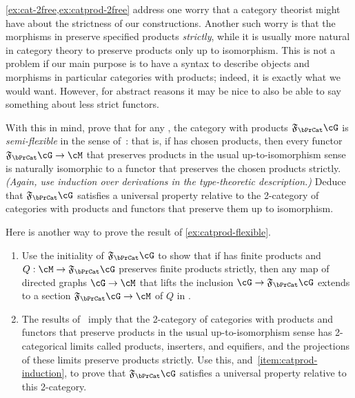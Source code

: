 \begin{ex}\label{ex:catprod-flexible}
  \cref{ex:cat-2free,ex:catprod-2free} address one worry that a category theorist might have about the strictness of our constructions.
  Another such worry is that the morphisms in \bPrCat preserve specified products \emph{strictly}, while it is usually more natural in category theory to preserve products only up to isomorphism.
  This is not a problem if our main purpose is to have a syntax to describe objects and morphisms in particular categories with products; indeed, it is exactly what we would want.
  However, for abstract reasons it may be nice to also be able to say something about less strict functors.

  With this in mind, prove that for any \cG, the category with products $\F\bPrCat\cG$ is \emph{semi-flexible} in the sense of~\cite{bkp:2dmonads}: that is, if \cM has chosen products, then every functor $\F\bPrCat\cG \to \cM$ that preserves products in the usual up-to-isomorphism sense is naturally isomorphic to a functor that preserves the chosen products strictly.
  \textit{(Again, use induction over derivations in the type-theoretic description.)}
  Deduce that $\F\bPrCat\cG$ satisfies a universal property relative to the 2-category of categories with products and functors that preserve them up to isomorphism.
\end{ex}

\begin{ex}\label{ex:catprod-induction}
  Here is another way to prove the result of \cref{ex:catprod-flexible}.
  \begin{enumerate}
  \item Use the initiality of $\F\bPrCat\cG$ to show that if \cM has finite products and $Q:\cM\to \F\bPrCat\cG$ preserves finite products strictly, then any map of directed graphs $\cG \to \cM$ that lifts the inclusion $\cG \to \F\bPrCat\cG$ extends to a section $\F\bPrCat\cG \to \cM$ of $Q$ in \bPrCat.\label{item:catprod-induction}
  \item The results of~\cite{bkp:2dmonads} imply that the 2-category of categories with products and functors that preserve products in the usual up-to-isomorphism sense has 2-categorical limits called products, inserters, and equifiers, and the projections of these limits preserve products strictly.
    Use this, and~\ref{item:catprod-induction}, to prove that $\F\bPrCat\cG$ satisfies a universal property relative to this 2-category.
  \end{enumerate}
\end{ex}


